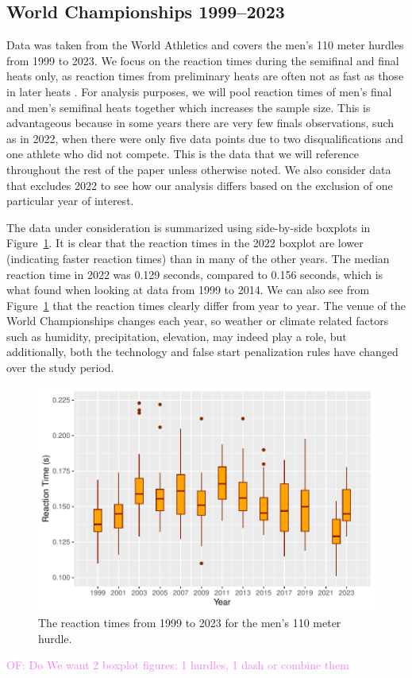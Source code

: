 \documentclass[12pt, letterpaper]{article}
\newcommand{\of}[1]{\textcolor{violet}{OF: #1}}
\begin{document}
\subsection{World Championships 1999--2023}\label{sec:dataworld}


Data was taken from the World Athletics 
and covers the men's 110 meter hurdles from 1999 to 2023.
We focus on the reaction times during the 
semifinal and final heats only, as reaction times from preliminary heats are 
often not as fast as those in later heats \citep[e.g.,][]{zhang2021correlation}. 
For analysis purposes, we will pool reaction times of men's final and 
men's semifinal heats together which increases the sample size. This is 
advantageous because in some years there are very few finals observations, such
as in 2022, when there were only five data points due to two disqualifications 
and one athlete who did not compete. This is the data that we will reference
throughout the rest of the paper unless otherwise noted. We also consider data 
that excludes 2022 to see how our analysis differs based on the exclusion of one
particular year of interest.


The data under consideration is summarized using side-by-side boxplots in 
Figure~\ref{fig:Boxplot}. It is clear that the reaction times in the 2022
boxplot are lower (indicating faster reaction times) than in many of the other
years. The median reaction time in 2022 was 0.129 seconds,  compared to 0.156
seconds, which is what \citet{brosnan2017effects} found when looking at data
from 1999 to 2014. We can also see from Figure~\ref{fig:Boxplot} that the 
reaction times clearly differ from year to year. The venue of the World 
Championships changes each year, so weather or climate related factors such as 
humidity, precipitation, elevation, may indeed play a role, but additionally,
both the technology and false start penalization rules have changed over the 
study period.


\begin{figure}[tbp]
  \centering
  \includegraphics{Boxplot}
  \caption{The reaction times from 1999 to 2023 for the men's 110 meter hurdle.}
  \label{fig:Boxplot}
\end{figure}
\of{Do We want 2 boxplot figures: 1 hurdles, 1 dash or combine them}
\end{document}
